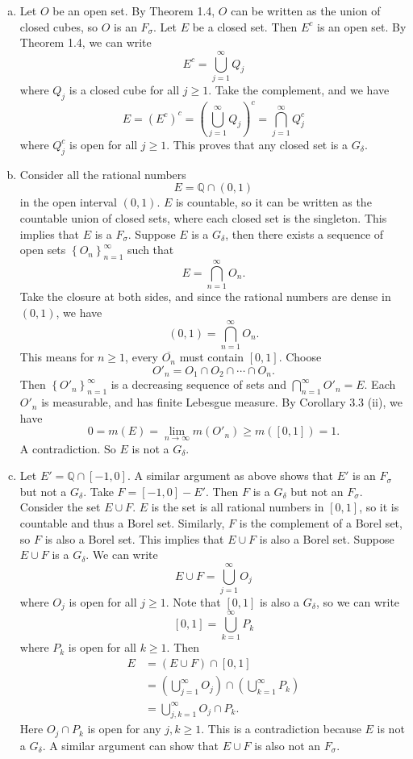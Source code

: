 \documentclass[letterpaper, 12pt]{article}
\begin{document}
\begin{solution}
\begin{enumerate}[(a)]
  \item Let \(O\) be an open set. By Theorem 1.4, \(O\) can be written as the union of closed cubes, so \(O\) is an \(F_\sigma\). Let \(E\) be a closed set. Then \(E^c\) is an open set. By Theorem 1.4, we can write 
  \[E^c=\bigcup_{j=1}^\infty Q_j\]
  where \(Q_j\) is a closed cube for all \(j\geq 1\). Take the complement, and we have 
  \[E=(E^c)^c=(\bigcup_{j=1}^\infty Q_j)^c=\bigcap_{j=1}^\infty Q_j^c\]
  where \(Q_j^c\) is open for all \(j\geq 1\). This proves that any closed set is a \(G_\delta\).
  \item Consider all the rational numbers 
  \[E=\mathbb{Q}\cap (0,1)\]
  in the open interval \((0,1)\). \(E\) is countable, so it can be written as the countable union of closed sets, where each closed set is the singleton. This implies that \(E\) is a \(F_\sigma\). Suppose \(E\) is a \(G_\delta\), then there exists a sequence of open sets \(\left\{ O_n \right\}_{n=1}^\infty\) such that
  \[E=\bigcap_{n=1}^\infty O_n.\]
  Take the closure at both sides, and since the rational numbers are dense in \((0,1)\), we have 
  \[(0,1)=\bigcap_{n=1}^\infty O_n.\] 
  This means for \(n\geq 1\), every \(\overline{O_n}\) must contain \([0,1]\). Choose 
  \[O'_n=O_1\cap O_2\cap\cdots \cap O_n.\]
  Then \(\left\{ O'_n \right\}_{n=1}^\infty\) is a decreasing sequence of sets and \(\bigcap_{n=1}^\infty O'_n=E\). Each \(O'_n\) is measurable, and has finite Lebesgue measure. By Corollary 3.3 (ii), we have 
  \[0=m(E)=\lim_{n\to \infty} m(O'_n)\geq m([0,1])=1.\]
  A contradiction. So \(E\) is not a \(G_\delta\).
  \item Let \(E'=\mathbb{Q}\cap [-1,0]\). A similar argument as above shows that \(E'\) is an \(F_\sigma\) but not a \(G_\delta\). Take \(F=[-1,0]-E'\). Then \(F\) is a \(G_\delta\) but not an \(F_\sigma\). Consider the set \(E\cup F\). \(E\) is the set is all rational numbers in \([0,1]\), so it is countable and thus a Borel set. Similarly, \(F\) is the complement of a Borel set, so \(F\) is also a Borel set. This implies that \(E\cup F\) is also a Borel set. Suppose \(E\cup F\) is a \(G_\delta\). We can write 
  \[E\cup F=\bigcup_{j=1}^\infty O_j\]
  where \(O_j\) is open for all \(j\geq 1\). Note that \([0,1]\) is also a \(G_\delta\), so we can write 
  \[[0,1]=\bigcup_{k=1}^\infty P_k\] 
  where \(P_k\) is open for all \(k\geq 1\). Then 
  \begin{align*}
       E&=(E\cup F)\cap [0,1]\\ 
        &=(\bigcup_{j=1}^\infty O_j)\cap (\bigcup_{k=1}^\infty P_k)\\ 
        &=\bigcup_{j,k=1}^\infty O_j\cap P_k.
  \end{align*}
  Here \(O_j\cap P_k\) is open for any \(j,k\geq 1\). This is a contradiction because \(E\) is not a \(G_\delta\). A similar argument can show that \(E\cup F\) is also not an \(F_\sigma\).
\end{enumerate}
\end{solution}
\end{document}
